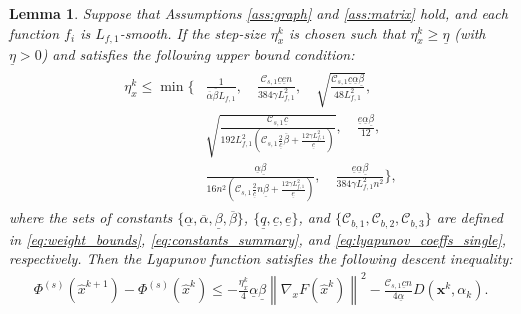 \documentclass[10pt,a4paper]{amsart}
\newtheorem{lemma}{Lemma}
\begin{document}
\begin{lemma}\label{lem:lyapunov_descent_single}
     Suppose that Assumptions \ref{ass:graph} and \ref{ass:matrix} hold, and each function $f_{i}$ is $L_{f,1}$-smooth.  If the step-size $\eta_x^k$ is chosen such that $\eta_x^k \geq \underline{\eta}$ (with $\underline{\eta} > 0$) and satisfies the following upper bound condition:
    \begin{align}\label{eq:step_size_conditions_single}
    \begin{aligned}
    \eta_x^{k} \leq \min\bigg\{
        & \frac{1}{\overline{\alpha}\overline{\beta}L_{f,1}}, \quad 
\frac{\mathcal{C}_{s,1} \underline{c}\underline{e}n}{384\gamma L_{f,1}^{2}}, \quad \sqrt{\frac{\mathcal{C}_{s,1} \underline{c}\underline{\alpha}\underline{\beta}}{48L_{f,1}^{2}}}, \\
        & \sqrt{\frac{\mathcal{C}_{s,1} \underline{c}}{192L_{f,1}^{2}\left(\mathcal{C}_{s,1} \frac{2}{\underline{c}}\overline{\beta}+\frac{12\gamma L_{f,1}^{2}}{\underline{e}}\right)}}, \quad 
          \frac{\underline{e}\underline{\alpha} \underline{\beta}}{12}, \\
        & \frac{\underline{\alpha}\underline{\beta}}{16n^{2}\left(\mathcal{C}_{s,1} \frac{2}{\underline{c}}n\underline{\beta}+\frac{12\gamma L_{f,1}^{2}}{\underline{e}}\right)}, \quad 
          \frac{\underline{e}\underline{\alpha} \underline{\beta}}{384\gamma L_{f,1}^{2}n^{2}}
    \bigg\},
    \end{aligned}
    \end{align}
     where the sets of constants $\{\underline{\alpha}, \overline{\alpha}, \underline{\beta}, \overline{\beta}\}$, $\{\underline{q}, \underline{c}, \underline{e}\}$, and $\{\mathcal{C}_{b,1}, \mathcal{C}_{b,2}, \mathcal{C}_{b,3}\}$ are defined in \eqref{eq:weight_bounds}, \eqref{eq:constants_summary}, and \eqref{eq:lyapunov_coeffs_single}, respectively. 
    Then the Lyapunov function satisfies the following descent inequality:
    \begin{align}
        \Phi^{(s)}({\hat{x}}^{k+1}) - \Phi^{(s)}({\hat{x}}^{k}) \leq - \frac{\eta_x^{k}}{4}\underline{\alpha}\underline{\beta} \left\| \nabla_{x}F(\hat{x}^{k}) \right\|^{2} - \frac{\mathcal{C}_{s,1} \underline{c}n}{4\underline{\alpha}} D(\mathbf{x}^{k}, \alpha_{k}).
    \end{align}
\end{lemma}
\end{document}
